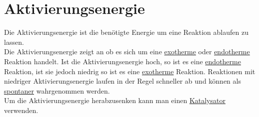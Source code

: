 \section{Aktivierungsenergie} 
\label{sec:aktivierungsenergie}
Die Aktivierungsenergie ist die benötigte Energie um eine Reaktion ablaufen zu lassen. \\
Die Aktivierungsenergie zeigt an ob es sich um eine \hyperref[sec:endo_exotherm]{exotherme} oder \hyperref[sec:endo_exotherm]{endotherme} Reaktion handelt. 
Ist die Aktivierungsenergie hoch, so ist es eine \hyperref[sec:endo_exotherm]{endotherme} Reaktion, ist sie jedoch niedrig so ist es eine \hyperref[sec:endo_exotherm]{exotherme} Reaktion. 
Reaktionen mit niedriger Aktivierungsenergie laufen in der Regel schneller ab und können als \hyperref[sec:spontane_vorgaenge]{spontaner} wahrgenommen werden. \\
Um die Aktivierungsenergie herabzusenken kann man einen \hyperref[sec:katalysator]{Katalysator} verwenden.

